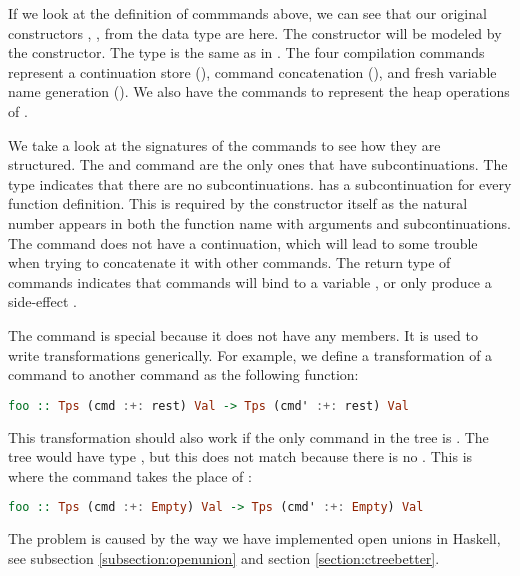 If we look at the definition of commmands above, we can see that our original constructors , ,  from the  data type are here. The  constructor will be modeled by the  constructor. The  type is the same as in . The four compilation commands represent a continuation store (), command concatenation (), and fresh variable name generation (). We also have the  commands to represent the heap operations of .

We take a look at the signatures of the commands to see how they are structured. The  and  command are the only ones that have subcontinuations. The  type indicates that there are no subcontinuations.  has a subcontinuation for every function definition. This is required by the constructor itself as the natural number  appears in both the function name with arguments and subcontinuations. The  command does not have a continuation, which will lead to some trouble when trying to concatenate it with other commands. The return type of commands indicates that commands will bind to a variable , or only produce a side-effect \icode{()}.

The  command is special because it does not have any members. It is used to write transformations generically. For example, we define a transformation of a command to another command as the following function:

\begin{lstlisting}[language=Haskell]
foo :: Tps (cmd :+: rest) Val -> Tps (cmd' :+: rest) Val
\end{lstlisting}

This transformation should also work if the only command in the tree is . The tree would have type , but this does not match because there is no . This is where the  command takes the place of :

\begin{lstlisting}[language=Haskell]
foo :: Tps (cmd :+: Empty) Val -> Tps (cmd' :+: Empty) Val
\end{lstlisting}

The  problem is caused by the way we have implemented open unions in Haskell, see subsection \ref{subsection:openunion} and section \ref{section:ctreebetter}.

